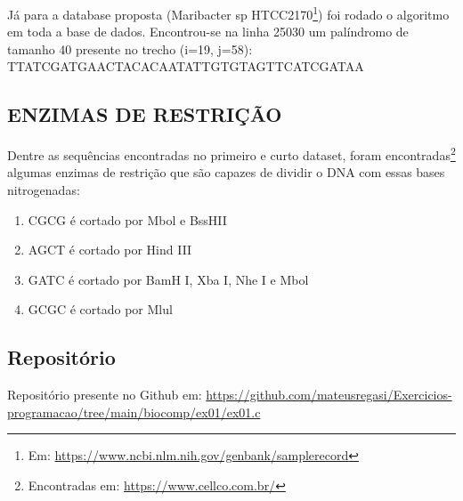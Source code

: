 \documentclass{report}
\begin{document}
Já para a database proposta (Maribacter sp HTCC2170\footnote{Em: \url{https://www.ncbi.nlm.nih.gov/genbank/samplerecord}}) foi rodado o algoritmo em toda a base de dados. Encontrou-se na linha 25030 um palíndromo de tamanho 40 presente no trecho (i=19, j=58): TTATCGATGAACTACACAATATTGTGTAGTTCATCGATAA



\subsection{ENZIMAS DE RESTRIÇÃO}

Dentre as sequências encontradas no primeiro e curto dataset, foram encontradas\footnote{Encontradas em: \url{https://www.cellco.com.br/}} algumas enzimas de restrição que são capazes de dividir o DNA com essas bases nitrogenadas:

\begin{enumerate} 
	\item CGCG é cortado por Mbol e BssHII
	\item AGCT é cortado por Hind III 
	\item GATC é cortado por BamH I, Xba I, Nhe I e Mbol 
	\item GCGC é cortado por Mlul
\end{enumerate}

\subsection{Repositório}

Repositório presente no Github em: \url{https://github.com/mateusregasi/Exercicios-programacao/tree/main/biocomp/ex01/ex01.c}
\end{document}
